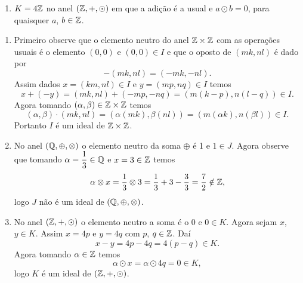 \begin{exemplo}
\begin{enumerate}[label={\arabic*})]
\begin{enumerate}[label=({\alph*})]
                \item $K = 4\mathbb{Z}$ no anel $(\mathbb{Z}, +, \odot)$ em que a adi\c{c}\~ao \'e a usual e $a \odot b = 0$, para quaisquer $a$, $b \in \mathbb{Z}$.
            \end{enumerate}
            \begin{solucao}
                \begin{enumerate}[label=({\alph*})]
                    \item Primeiro observe que o elemento neutro do anel $\mathbb{Z} \times \mathbb{Z}$ com as operações usuais é o elemento $(0, 0)$ e $(0, 0) \in I$ e que o oposto de $(mk, nl)$
                        é dado por
                        \[
                            -(mk, nl) = (-mk, -nl).
                        \]
                        Assim dados $x = (km, nl) \in I$ e $y = (mp, nq) \in I$ temos
                        \[
                            x + (-y) = (mk, nl) + (-mp, -nq) = (m(k - p), n(l - q)) \in I.
                        \]
                        Agora tomando $(\alpha, \beta) \in \mathbb{Z} \times \mathbb{Z}$ temos
                        \[
                            (\alpha, \beta) \cdot (mk, nl) = (\alpha(mk), \beta(nl)) = (m(\alpha k), n(\beta l)) \in I.
                        \]
                        Portanto $I$ é um ideal de $\mathbb{Z} \times \mathbb{Z}$.

                    \item No anel $(\mathbb{Q}, \oplus, \otimes)$ o elemento neutro da soma $\oplus$ é 1 e $1 \in J$. Agora observe que tomando $\alpha = \dfrac{1}{3} \in \mathbb{Q}$ e $x =
                        3 \in \mathbb{Z}$ temos
                        \[
                            \alpha \otimes x = \dfrac{1}{3} \otimes 3 = \dfrac{1}{3} + 3 - \dfrac{3}{3} = \dfrac{7}{2} \notin \mathbb{Z},
                        \]
                        logo $J$ não é um ideal de $(\mathbb{Q}, \oplus, \otimes)$.

                    \item No anel $(\mathbb{Z}, +, \odot)$ o elemento neutro a soma é o 0 e $0 \in K$. Agora sejam $x$, $y \in K$. Assim $x = 4p$ e $y = 4q$ com $p$, $q \in \mathbb{Z}$. Daí
                        \[
                            x - y = 4p - 4q = 4(p - q) \in K.
                        \]
                        Agora tomando $\alpha \in \mathbb{Z}$ temos
                        \[
                            \alpha \odot x = \alpha \odot 4q = 0 \in K,
                        \]
                        logo $K$ é um ideal de $(\mathbb{Z}, +, \odot)$.
                \end{enumerate}
            \end{solucao}
    \end{enumerate}
\end{exemplo}

